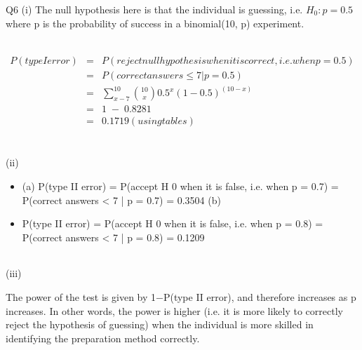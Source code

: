 \documentclass[a4paper,12pt]{article}
\begin{document}
Q6
(i)
The null hypothesis here is that the individual is guessing, i.e. $H_0 : p = 0.5$
where p is the probability of success in a binomial(10, p) experiment.


\begin{eqnarray*}
P(type I error) 
&=& P(reject null hypothesis when it is correct, i.e. when p = 0.5)\\
&=& P(correct answers \leq 7 | p = 0.5)\\
&=& \sum^{10}_{x-7} {10 \choose x} 0.5^x(1-0.5)^{(10-x)} \\
&=& 1 \;-\;0.8281 \\
&=& 0.1719 (using tables)\\
\end{eqnarray*}

\newpage

\begin{table}[ht!]
 \centering
 \begin{tabular}{|p{15cm}|}
 \hline  
 
 \\ \hline
  \end{tabular}
\end{table}

(ii)
 \begin{itemize}
\item (a) P(type II error) = P(accept H 0 when it is false, i.e. when p = 0.7) 
= P(correct answers < 7 | p = 0.7) = 0.3504 
(b)
\item 
P(type II error) = P(accept H 0 when it is false, i.e. when p = 0.8)
= P(correct answers < 7 | p = 0.8) = 0.1209
\end{itemize}
\newpage

\begin{table}[ht!]
 \centering
 \begin{tabular}{|p{15cm}|}
 \hline  
 
 \\ \hline
  \end{tabular}
\end{table}
(iii)

The power of the test is given by 1−P(type II error), and therefore increases as
p increases. In other words, the power is higher (i.e. it is more likely to
correctly reject the hypothesis of guessing) when the individual is more skilled
in identifying the preparation method correctly.

\end{document}
